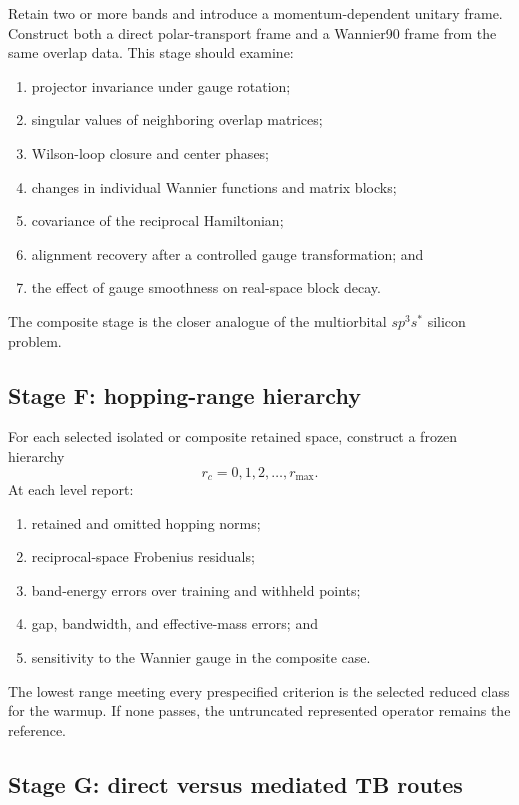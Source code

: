 Retain two or more bands and introduce a momentum-dependent unitary frame.
Construct both a direct polar-transport frame and a Wannier90 frame from the
same overlap data. This stage should examine:
\begin{enumerate}
    \item projector invariance under gauge rotation;
    \item singular values of neighboring overlap matrices;
    \item Wilson-loop closure and center phases;
    \item changes in individual Wannier functions and matrix blocks;
    \item covariance of the reciprocal Hamiltonian;
    \item alignment recovery after a controlled gauge transformation; and
    \item the effect of gauge smoothness on real-space block decay.
\end{enumerate}
The composite stage is the closer analogue of the multiorbital
$sp^3s^{\ast}$ silicon problem.

\subsection*{Stage F: hopping-range hierarchy}

For each selected isolated or composite retained space, construct a frozen
hierarchy
\begin{equation}
    r_c=0,1,2,\ldots,r_{\max}.
\end{equation}
At each level report:
\begin{enumerate}
    \item retained and omitted hopping norms;
    \item reciprocal-space Frobenius residuals;
    \item band-energy errors over training and withheld points;
    \item gap, bandwidth, and effective-mass errors; and
    \item sensitivity to the Wannier gauge in the composite case.
\end{enumerate}
The lowest range meeting every prespecified criterion is the selected reduced
class for the warmup. If none passes, the untruncated represented operator
remains the reference.

\subsection*{Stage G: direct versus mediated TB routes}

